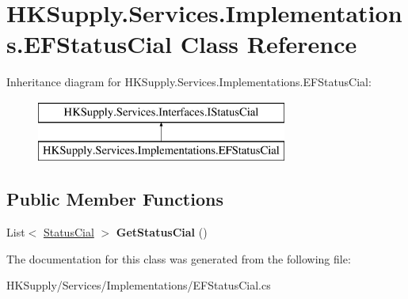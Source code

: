 \hypertarget{class_h_k_supply_1_1_services_1_1_implementations_1_1_e_f_status_cial}{}\section{H\+K\+Supply.\+Services.\+Implementations.\+E\+F\+Status\+Cial Class Reference}
\label{class_h_k_supply_1_1_services_1_1_implementations_1_1_e_f_status_cial}
Inheritance diagram for H\+K\+Supply.\+Services.\+Implementations.\+E\+F\+Status\+Cial\+:\begin{figure}[H]
\begin{center}
\leavevmode
\includegraphics[height=2.000000cm]{class_h_k_supply_1_1_services_1_1_implementations_1_1_e_f_status_cial}
\end{center}
\end{figure}
\subsection*{Public Member Functions}
\begin{DoxyCompactItemize}
\item 
\mbox{\label{class_h_k_supply_1_1_services_1_1_implementations_1_1_e_f_status_cial_aadcffc9c57a266d260b7f5a0e465e7dd}} 
List$<$ \mbox{\hyperlink{class_h_k_supply_1_1_models_1_1_status_cial}{Status\+Cial}} $>$ {\bfseries Get\+Status\+Cial} ()
\end{DoxyCompactItemize}


The documentation for this class was generated from the following file\+:\begin{DoxyCompactItemize}
\item 
H\+K\+Supply/\+Services/\+Implementations/E\+F\+Status\+Cial.\+cs\end{DoxyCompactItemize}
